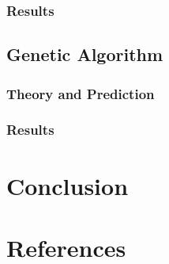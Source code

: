 \documentclass[
	letterpaper, %
]{mlreport}
\begin{document}
\subsubsection{Results}

\subsection{Genetic Algorithm}
\subsubsection{Theory and Prediction}
\subsubsection{Results}

\section{Conclusion}

\newpage

\section{References}
\nocite{Hayes19}
\nocite{Mitchell}
\printbibliography
\end{document}
